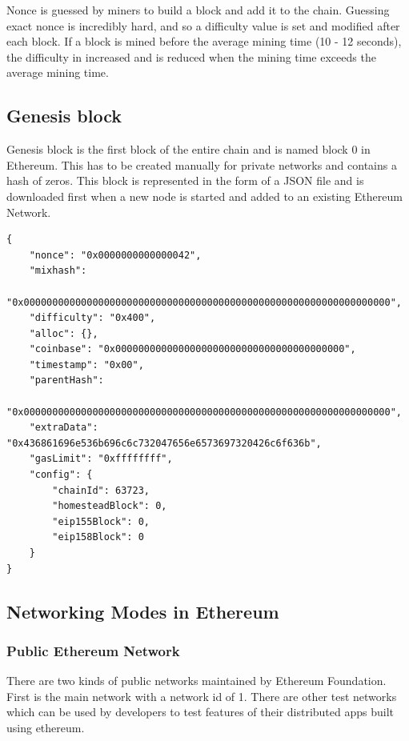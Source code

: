 \documentclass[11pt,openright]{report}
\begin{document}
Nonce is guessed by miners to build a block and add it to the chain. Guessing exact nonce is incredibly hard, and so a difficulty value is set and modified after each block. If a block is mined before the average mining time (10 - 12 seconds), the difficulty in increased and is reduced when the mining time exceeds the average mining time.

\subsection{Genesis block}
Genesis block is the first block of the entire chain and is named block 0 in Ethereum. This has to be created manually for private networks and contains a hash of zeros. This block is represented in the form of a JSON file and is downloaded first when a new node is started and added to an existing Ethereum Network.

\begin{lstlisting}[basicstyle=\small,]
{
    "nonce": "0x0000000000000042",
    "mixhash": 
    "0x0000000000000000000000000000000000000000000000000000000000000000",
    "difficulty": "0x400",
    "alloc": {}, 
    "coinbase": "0x0000000000000000000000000000000000000000",
    "timestamp": "0x00",
    "parentHash": 
    "0x0000000000000000000000000000000000000000000000000000000000000000",
    "extraData": "0x436861696e536b696c6c732047656e6573697320426c6f636b",
    "gasLimit": "0xffffffff",
    "config": {
        "chainId": 63723,
        "homesteadBlock": 0,
        "eip155Block": 0,
        "eip158Block": 0
    }
}
\end{lstlisting}

\subsection{Networking Modes in Ethereum}
\subsubsection{Public Ethereum Network}
There are two kinds of public networks maintained by Ethereum Foundation. 
First is the main network with a network id of 1. There are other test networks which can be used by developers to test features of their distributed apps built using ethereum. 
\end{document}
